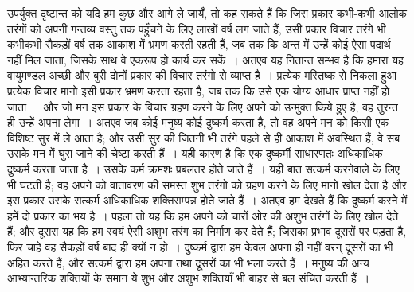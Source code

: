 उपर्युक्त दृष्टान्त को यदि हम कुछ और आगे ले जायँ, तो कह सकते हैं कि जिस प्रकार कभी-कभी आलोक तरंगों को अपनी गन्तव्य वस्तु तक पहुँचने के लिए लाखों वर्ष लग जाते हैं, उसी प्रकार विचार तरंगे भी कभीकभी सैकड़ों वर्ष तक आकाश में भ्रमण करती रहती हैं, जब तक कि अन्त में उन्हें कोई ऐसा पदार्थ नहीं मिल जाता, जिसके साथ वे एकरूप हो कार्य कर सकें~। अतएव यह नितान्त सम्भव है कि हमारा यह वायुमण्डल अच्छी और बुरी दोनों प्रकार की विचार तरंगो से व्याप्त है~। प्रत्येक मस्तिष्क से निकला हुआ प्रत्येक विचार मानो इसी प्रकार भ्रमण करता रहता है, जब तक कि उसे एक योग्य आधार प्राप्त नहीं हो जाता~। और जो मन इस प्रकार के विचार ग्रहण करने के लिए अपने को उन्मुक्त किये हुए है, वह तुरन्त ही उन्हें अपना लेगा~। अतएव जब कोई मनुष्य कोई दुष्कर्म करता है, तो वह अपने मन को किसी एक विशिष्ट सुर में ले आता है; और उसी सुर की जितनी भी तरंगे पहले से ही आकाश में अवस्थित हैं, वे सब उसके मन में घुस जाने की चेष्टा करती हैं~। यही कारण है कि एक दुष्कर्मी साधारणतः अधिकाधिक दुष्कर्म करता जाता है~। उसके कर्म क्रमशः प्रबलतर होते जाते हैं~। यही बात सत्कर्म करनेवाले के लिए भी घटती है; वह अपने को वातावरण की समस्त शुभ तरंगो को ग्रहण करने के लिए मानो खोल देता है और इस प्रकार उसके सत्कर्म अधिकाधिक शक्तिसम्पन्न होते जाते हैं~। अतएव हम देखते हैं कि दुष्कर्म करने में हमें दो प्रकार का भय है~। पहला तो यह कि हम अपने को चारों ओर की अशुभ तरंगों के लिए खोल देते हैं; और दूसरा यह कि हम स्वयं ऐसी अशुभ तरंग का निर्माण कर देते हैं; जिसका प्रभाव दूसरों पर पड़ता है, फिर चाहे वह सैकड़ों वर्ष बाद ही क्यों न हो~। दुष्कर्म द्वारा हम केवल अपना ही नहीं वरन् दूसरों का भी अहित करते हैं, और सत्कर्म द्वारा हम अपना तथा दूसरों का भी भला करते हैं~। मनुष्य की अन्य आभ्यान्तरिक शक्तियों के समान ये शुभ और अशुभ शक्तियाँ भी बाहर से बल संचित करती हैं~।

